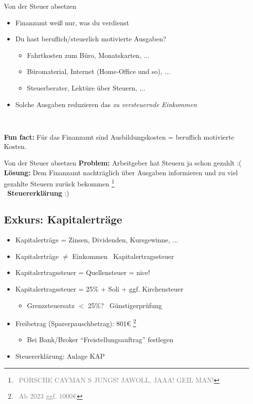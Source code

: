 \documentclass{beamer}
\newcommand{\n}{\hfill\\\vspace{0.25cm}}
\let\oldfootnote\footnote
\renewcommand{\footnote}[1]
{%
	\oldfootnote
	{
		\tiny
		\textcolor{gray}{\ #1}
	}%
}
\begin{document}
			\begin{frame}{Von der Steuer absetzen}
				\begin{itemize}
					\item Finanzamt weiß nur, was du verdienst
					\item Du hast beruflich/steuerlich motivierte Ausgaben?
					\begin{itemize}
						\item Fahrtkosten zum Büro, Monatskarten, ...
						\item Büromaterial, Internet (Home-Office und so), ...
						\item Steuerberater, Lektüre über Steuern, ...
					\end{itemize}
					\item Solche Ausgaben reduzieren das \textit{zu versteuernde Einkommen}
				\end{itemize}\n\pause
				
				\textbf{Fun fact:} Für das Finanzamt sind Ausbildungskosten = beruflich motivierte Kosten.
			\end{frame}
				
			\begin{frame}{Von der Steuer absetzen}
				\textbf{Problem:} Arbeitgeber hat Steuern ja schon gezahlt :(\n
				\textbf{Lösung:} Dem Finanzamt nachträglich über Ausgaben informieren und zu viel gezahlte Steuern zurück bekommen\footnote{PORSCHE CAYMAN S JUNGS! JAWOLL, JAAA! GEIL MAN!}\n
				\textrightarrow\ \textbf{Steuererklärung} :)
			\end{frame}
		
		\subsection{Exkurs: Kapitalerträge}
		
			\begin{frame}
				\begin{itemize}
					\item Kapitalerträge = Zinsen, Dividenden, Kursgewinne, ...
					\item Kapitalerträge $\neq$ Einkommen \textrightarrow\ Kapitalertragssteuer\pause
					\item Kapitalertragssteuer = Quellensteuer = nice!
					\item Kapitalertragssteuer = 25\% + Soli + ggf. Kirchensteuer
					\begin{itemize}
						\item Grenzsteuersatz $<$ 25\%? \textrightarrow\ Günstigerprüfung
					\end{itemize}\pause
					\item Freibetrag (Sparerpauschbetrag): 801€\footnote{Ab 2023 ggf. 1000€}
					\begin{itemize}
						\item Bei Bank/Broker "`Freistellungsauftrag"' festlegen
					\end{itemize}
					\item Steuererklärung: Anlage KAP
				\end{itemize}
			\end{frame}
		
\end{document}

